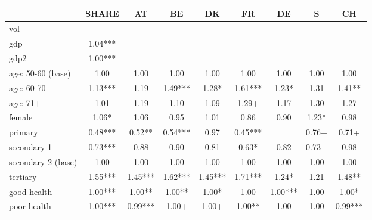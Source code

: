 {
\def\sym#1{\ifmmode^{#1}\else\(^{#1}\)\fi}
\begin{tabular}{l*{8}{c}}
\hline\hline
            &\multicolumn{1}{c}{SHARE}&\multicolumn{1}{c}{AT}&\multicolumn{1}{c}{BE}&\multicolumn{1}{c}{DK}&\multicolumn{1}{c}{FR}&\multicolumn{1}{c}{DE}&\multicolumn{1}{c}{S}&\multicolumn{1}{c}{CH}\\
\hline
vol         &               &               &               &               &               &               &               &               \\
gdp         &        1.04***&               &               &               &               &               &               &               \\
gdp2        &        1.00***&               &               &               &               &               &               &               \\
age: 50-60 (base)&        1.00   &        1.00   &        1.00   &        1.00   &        1.00   &        1.00   &        1.00   &        1.00   \\
age: 60-70  &        1.13***&        1.19   &        1.49***&        1.28*  &        1.61***&        1.23*  &        1.31   &        1.41** \\
age: 71+    &        1.01   &        1.19   &        1.10   &        1.09   &        1.29+  &        1.17   &        1.30   &        1.27   \\
female      &        1.06*  &        1.06   &        0.95   &        1.01   &        0.86   &        0.90   &        1.23*  &        0.98   \\
primary     &        0.48***&        0.52** &        0.54***&        0.97   &        0.45***&               &        0.76+  &        0.71+  \\
secondary 1 &        0.73***&        0.88   &        0.90   &        0.81   &        0.63*  &        0.82   &        0.73+  &        0.98   \\
secondary 2 (base)&        1.00   &        1.00   &        1.00   &        1.00   &        1.00   &        1.00   &        1.00   &        1.00   \\
tertiary    &        1.55***&        1.45***&        1.62***&        1.45***&        1.71***&        1.24*  &        1.21   &        1.48** \\
good health &        1.00***&        1.00** &        1.00** &        1.00*  &        1.00   &        1.00***&        1.00   &        1.00*  \\
poor health &        1.00***&        0.99***&        1.00+  &        1.00+  &        1.00** &        1.00   &        1.00   &        0.99***\\

\end{tabular}}
